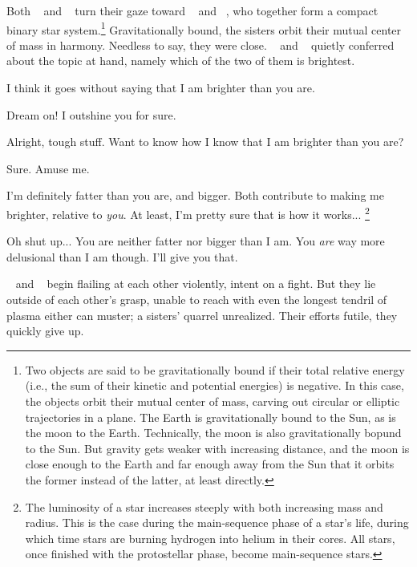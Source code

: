 \documentclass[main.tex]{subfiles}
\begin{document}
\par \nar Both \rmmaia~ and \rmelectra~ turn their gaze toward \rmtaygete~ and \rmalcyone~, who together form a compact binary star system.\footnote{Two objects are said to be gravitationally bound if their total relative energy (i.e., the sum of their kinetic and potential energies) is negative.  In this case, the objects orbit their mutual center of mass, carving out circular or elliptic trajectories in a plane.  The Earth is gravitationally bound to the Sun, as is the moon to the Earth.  Technically, the moon is also gravitationally bopund to the Sun.  But gravity gets weaker with increasing distance, and the moon is close enough to the Earth and far enough away from the Sun that it orbits the former instead of the latter, at least directly.}  Gravitationally bound, the sisters orbit their mutual center of mass in harmony.  Needless to say, they were close.  \rmtaygete~ and \rmalcyone~ quietly conferred about the topic at hand, namely which of the two of them is brightest.

\par \Taygete I think it goes without saying that I am brighter than you are.

\par \Alcyone Dream on!  I outshine you for sure.

\par \Taygete Alright, tough stuff.  Want to know how I know that I am brighter than you are?

\par \Alcyone Sure.  Amuse me.

\par \Taygete I'm definitely fatter than you are, and bigger.  Both contribute to making me brighter, relative to \textit{you}.  At least, I'm pretty sure that is how it works...  \footnote{The luminosity of a star increases steeply with both increasing mass and radius.  This is the case during the main-sequence phase of a star's life, during which time stars are burning hydrogen into helium in their cores.  All stars, once finished with the protostellar phase, become main-sequence stars.}

\par \Alcyone Oh shut up...  You are neither fatter nor bigger than I am.  You \textit{are} way more delusional than I am though.  I'll give you that.

\par \nar \rmtaygete~ and \rmalcyone~ begin flailing at each other violently, intent on a fight.  But they lie outside of each other's grasp, unable to reach with even the longest tendril of plasma either can muster; a sisters' quarrel unrealized.  Their efforts futile, they quickly give up.  
\end{document}
